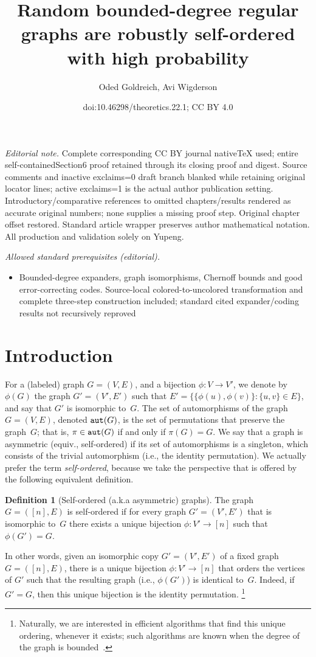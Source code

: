\documentclass[10pt,a4paper]{article}
\title{Random bounded-degree regular graphs are robustly self-ordered with high probability}
\author{Oded Goldreich, Avi Wigderson}
\date{doi:10.46298/theoretics.22.1; CC BY 4.0}
\theoremstyle{definition}
\newtheorem{definition}[theorem]{Definition}
\newcommand{\BD}{\begin{definition}}   \newcommand{\ED}{\end{definition}}
\begin{document}
\maketitle
\noindent\textit{Editorial note.} Complete corresponding CC BY journal nativeTeX used; entire self-containedSection6 proof retained through its closing proof and digest. Source comments and inactive exclaims=0 draft branch blanked while retaining original locator lines; active exclaims=1 is the actual author publication setting. Introductory/comparative references to omitted chapters/results rendered as accurate original numbers; none supplies a missing proof step. Original chapter offset restored. Standard article wrapper preserves author mathematical notation. All production and validation solely on Yupeng.\par\medskip
\noindent\textit{Allowed standard prerequisites (editorial).}\begin{itemize}
\item Bounded-degree expanders, graph isomorphisms, Chernoff bounds and good error-correcting codes. Source-local colored-to-uncolored transformation and complete three-step construction included; standard cited expander/coding results not recursively reproved
\end{itemize}\medskip
\section{Introduction}
For a (labeled) graph $G=(V,E)$, and a bijection $\phi:V\to V'$,
we denote by $\phi(G)$ the graph $G'=(V',E')$
such that $E'=\{\{\phi(u),\phi(v)\}:\{u,v\}\!\in\!E\}$,
and say that $G'$ is {\sf isomorphic} to~$G$.
The set of {\sf automorphisms} of the graph $G=(V,E)$,
denoted ${\tt aut}(G)$,
is the set of permutations that preserve the graph~$G$;
that is, $\pi\in{\tt aut}(G)$ if and only if $\pi(G)=G$.
We say that a graph is {\sf asymmetric} (equiv., {\sf self-ordered})
if its set of automorphisms is a singleton,
which consists of the trivial automorphism
(i.e., the identity permutation).
We actually prefer the term {\em self-ordered}, because we take
the perspective that is offered by the following equivalent definition.

%
\BD[Self-ordered (a.k.a asymmetric) graphs]
\label{asymmetric:def}
%
The graph $G=([n],E)$ is {\sf self-ordered}
if for every graph $G'=(V',E')$ that is isomorphic to~$G$
there exists a unique bijection $\phi:V'\to[n]$ such that $\phi(G')=G$.
\ED
In other words,
given an isomorphic copy $G'=(V',E')$ of a fixed graph $G=([n],E)$,
there is a unique bijection $\phi:V'\to[n]$ that orders the vertices of $G'$
such that the resulting graph (i.e., $\phi(G')$) is identical to~$G$.
Indeed, if $G'=G$, then this unique bijection is the identity permutation.
\footnote{Naturally, we are interested in efficient algorithms
that find this unique ordering, whenever it exists;
such algorithms are known
when the degree of the graph is bounded~\cite{L}.}
\end{document}

